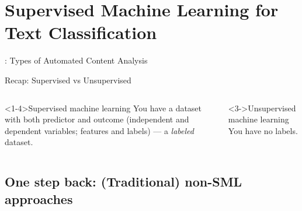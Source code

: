 \section{Supervised Machine Learning for Text Classification}

\begin{frame}{\cite{Boumans2016}: Types of Automated Content Analysis}
\end{frame}


\begin{frame}{Recap: Supervised vs Unsupervised}
\begin{columns}[t]

\begin{block}<1-4>{Supervised machine learning}
  You have a dataset with both predictor and outcome (independent and dependent variables; features and labels) --- a \emph{labeled} dataset.
\end{block}


\begin{block}<3->{Unsupervised machine learning}
  You have no labels. \\
\end{block}

\end{columns}

\end{frame}



\subsection{One step back: (Traditional) non-SML approaches}

